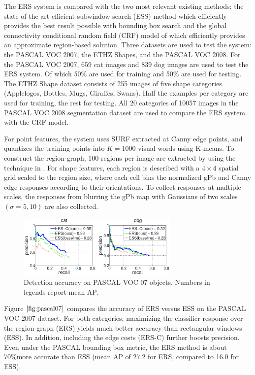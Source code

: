 \documentclass{SMBV12}
\begin{document}
The ERS system is compared with the two most relevant existing methods: the state-of-the-art efficient subwindow search (ESS) method \cite{lampert2008beyond} which efficiently provides the best result possible with bounding box search and the global connectivity conditional random field (CRF) model of \cite{nowozin2009global} which efficiently provides an approximate region-based solution. Three datasets are used to test the system: the PASCAL VOC 2007, the ETHZ Shapes, and the PASCAL VOC 2008. For the PASCAL VOC 2007, 659 cat images and 839 dog images are used to test the ERS system. Of which 50\% are used for training and 50\% are used for testing. The ETHZ Shape dataset consists of 255 images of five shape categories (Applelogos, Bottles, Mugs, Giraffes, Swans). Half the examples per category are used for training, the rest for testing. All 20 categories of 10057 images in the PASCAL VOC 2008 segmentation dataset are used to compare the ERS system with the CRF model.

For point features, the system uses SURF extracted at Canny edge points, and quantizes the training points into $K = 1000$ visual words using K-means. To construct the region-graph, 100 regions per image are extracted by using the technique in \cite{arbelaez2009contours}. For shape features, each region is described with a $4 \times 4$ spatial grid scaled to the region size, where each cell bins the normalized gPb and Canny edge responses according to their orientations. To collect responses at multiple scales, the responses from blurring the gPb map with Gaussians of two scales $(\sigma = 5, 10)$ are also collected.

\begin{figure}
\centering
\includegraphics[width=0.7\textwidth]{images/pascal_voc07.png}
\caption{Detection accuracy on PASCAL VOC 07 objects. Numbers in legends report mean AP.}
\label{fig:pascal07}
\end{figure}

Figure $\ref{fig:pascal07}$ compares the accuracy of ERS versus ESS on the PASCAL VOC 2007 dataset. For both categories, maximizing the classifier response over the region-graph (ERS) yields much better accuracy than rectangular windows (ESS). In addition, including the edge costs (ERS-C) further boosts precision. Even under the PASCAL bounding box metric, the ERS method is about 70\%more accurate than ESS (mean AP of 27.2 for ERS, compared to 16.0 for ESS).
\end{document}
